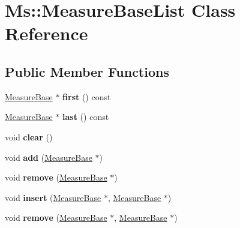 \hypertarget{class_ms_1_1_measure_base_list}{}\section{Ms\+:\+:Measure\+Base\+List Class Reference}
\label{class_ms_1_1_measure_base_list}
\subsection*{Public Member Functions}
\begin{DoxyCompactItemize}
\item 
\mbox{\label{class_ms_1_1_measure_base_list_a55f35e1782bf231894ba35e6c595851e}} 
\hyperlink{class_ms_1_1_measure_base}{Measure\+Base} $\ast$ {\bfseries first} () const
\item 
\mbox{\label{class_ms_1_1_measure_base_list_ad9577e1a2a9b9e4734405c3214436359}} 
\hyperlink{class_ms_1_1_measure_base}{Measure\+Base} $\ast$ {\bfseries last} () const
\item 
\mbox{\label{class_ms_1_1_measure_base_list_ab233dfb06c8e56998cebda31981d47b7}} 
void {\bfseries clear} ()
\item 
\mbox{\label{class_ms_1_1_measure_base_list_a69a46f2c69a25d06b511b4da29a3dcbd}} 
void {\bfseries add} (\hyperlink{class_ms_1_1_measure_base}{Measure\+Base} $\ast$)
\item 
\mbox{\label{class_ms_1_1_measure_base_list_ad1d9ddcb5fe574ec96cc090c18f586a0}} 
void {\bfseries remove} (\hyperlink{class_ms_1_1_measure_base}{Measure\+Base} $\ast$)
\item 
\mbox{\label{class_ms_1_1_measure_base_list_a2fa66e7d8dcff33129278cf64332e16b}} 
void {\bfseries insert} (\hyperlink{class_ms_1_1_measure_base}{Measure\+Base} $\ast$, \hyperlink{class_ms_1_1_measure_base}{Measure\+Base} $\ast$)
\item 
\mbox{\label{class_ms_1_1_measure_base_list_af40e31a55398bb62d63ebb038aa0b5d4}} 
void {\bfseries remove} (\hyperlink{class_ms_1_1_measure_base}{Measure\+Base} $\ast$, \hyperlink{class_ms_1_1_measure_base}{Measure\+Base} $\ast$)

\end{DoxyCompactItemize}
